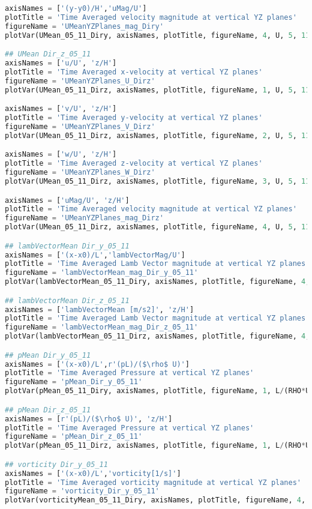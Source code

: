 \begin{lstlisting}[language=python]
axisNames = ['(y-y0)/H','uMag/U']
plotTitle = 'Time Averaged velocity magnitude at vertical YZ planes'
figureName = 'UMeanYZPlanes_mag_Diry'
plotVar(UMean_05_11_Diry, axisNames, plotTitle, figureName, 4, U, 5, 11)

## UMean Dir_z_05_11
axisNames = ['u/U', 'z/H']
plotTitle = 'Time Averaged x-velocity at vertical YZ planes'
figureName = 'UMeanYZPlanes_U_Dirz'
plotVar(UMean_05_11_Dirz, axisNames, plotTitle, figureName, 1, U, 5, 11)

axisNames = ['v/U', 'z/H']
plotTitle = 'Time Averaged y-velocity at vertical YZ planes'
figureName = 'UMeanYZPlanes_V_Dirz'
plotVar(UMean_05_11_Dirz, axisNames, plotTitle, figureName, 2, U, 5, 11)

axisNames = ['w/U', 'z/H']
plotTitle = 'Time Averaged z-velocity at vertical YZ planes'
figureName = 'UMeanYZPlanes_W_Dirz'
plotVar(UMean_05_11_Dirz, axisNames, plotTitle, figureName, 3, U, 5, 11)

axisNames = ['uMag/U', 'z/H']
plotTitle = 'Time Averaged velocity magnitude at vertical YZ planes'
figureName = 'UMeanYZPlanes_mag_Dirz'
plotVar(UMean_05_11_Dirz, axisNames, plotTitle, figureName, 4, U, 5, 11)

## lambVectorMean Dir_y_05_11
axisNames = ['(x-x0)/L','lambVectorMag/U']
plotTitle = 'Time Averaged Lamb Vector magnitude at vertical YZ planes'
figureName = 'lambVectorMean_mag_Dir_y_05_11'
plotVar(lambVectorMean_05_11_Diry, axisNames, plotTitle, figureName, 4, 1, 5, 11)

## lambVectorMean Dir_z_05_11
axisNames = ['lambVectorMean [m/s2]', 'z/H']
plotTitle = 'Time Averaged Lamb Vector magnitude at vertical YZ planes'
figureName = 'lambVectorMean_mag_Dir_z_05_11'
plotVar(lambVectorMean_05_11_Dirz, axisNames, plotTitle, figureName, 4, 1, 5, 11)

## pMean Dir_y_05_11
axisNames = ['(x-x0)/L',r'(pL)/($\rho$ U)']
plotTitle = 'Time Averaged Pressure at vertical YZ planes'
figureName = 'pMean_Dir_y_05_11'
plotVar(pMean_05_11_Diry, axisNames, plotTitle, figureName, 1, L/(RHO*U), 5, 11)

## pMean Dir_z_05_11
axisNames = [r'(pL)/($\rho$ U)', 'z/H']
plotTitle = 'Time Averaged Pressure at vertical YZ planes'
figureName = 'pMean_Dir_z_05_11'
plotVar(pMean_05_11_Dirz, axisNames, plotTitle, figureName, 1, L/(RHO*U), 5, 11)

## vorticity Dir_y_05_11
axisNames = ['(x-x0)/L','vorticity[1/s]']
plotTitle = 'Time Averaged vorticity magnitude at vertical YZ planes'
figureName = 'vorticity_Dir_y_05_11'
plotVar(vorticityMean_05_11_Diry, axisNames, plotTitle, figureName, 4, 1, 5, 11)


\end{lstlisting}

